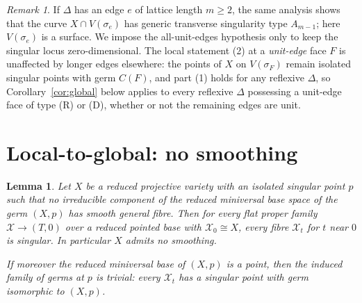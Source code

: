 \documentclass[11pt]{amsart}
\newtheorem{lemma}[theorem]{Lemma}
\theoremstyle{definition}
\theoremstyle{remark}
\newtheorem{remark}[theorem]{Remark}
\begin{document}
\begin{remark}\label{rem:longedges}
If $\Delta$ has an edge $e$ of lattice length $m \ge 2$, the same analysis
shows that the curve $X\cap V(\sigma_e)$ has generic transverse
singularity type $A_{m-1}$; here $V(\sigma_e)$ is a surface.  We impose the
all-unit-edges hypothesis only to keep the
singular locus zero-dimensional.  The local statement (2) at a
\emph{unit-edge} face $F$ is unaffected by longer edges elsewhere: the
points of $X$ on $V(\sigma_F)$ remain isolated singular points with germ
$C(F)$, and part (1) holds for any reflexive $\Delta$, so
Corollary~\ref{cor:global} below applies to every reflexive $\Delta$
possessing a unit-edge face of type \textup{(R)} or \textup{(D)}, whether
or not the remaining edges are unit.
\end{remark}

\section{Local-to-global: no smoothing}\label{sec:nosmoothing}

\begin{lemma}\label{lem:localglobal}
Let $X$ be a reduced projective variety with an isolated singular point $p$
such that no irreducible component of the reduced miniversal base space of the
germ $(X,p)$ has smooth general fibre.  Then for every flat proper family
$\mathcal{X} \to (T,0)$ over a reduced pointed base with
$\mathcal{X}_0 \cong X$, every fibre $\mathcal{X}_t$ for $t$ near $0$ is
singular.  In particular $X$ admits no smoothing.

If moreover the reduced miniversal base of $(X,p)$ is a point, then the
induced family of germs at $p$ is trivial: every $\mathcal{X}_t$ has a
singular point with germ isomorphic to $(X,p)$.
\end{lemma}
\end{document}
